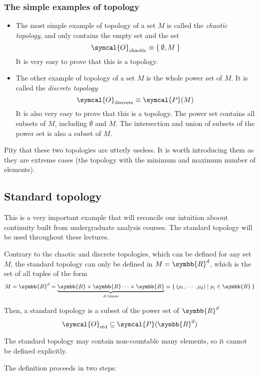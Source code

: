 \subsubsection{The simple examples of topology}
\begin{itemize}
\item The most simple example of topology of a set $M$ is called the
  \emph{chaotic topology}, and only contains the empty set and the set
  \[
    \symcal{O}_{\text{chaotic}} \equiv \Set{\emptyset, M}
  \]
  It is very easy to prove that this is a topology.
\item The other example of topology of a set $M$ is the whole power set of $M$. It is
  called the \emph{discrete topology}
  \[
    \symcal{O}_{\text{discrete}} \equiv \symcal{P}(M)
  \]
  It is also very easy to prove that this is a topology. The power set contains all
  subsets of $M$, including $\emptyset$ and $M$. The intersection and union of subsets
  of the power set is also a subset of $M$.
\end{itemize}
Pity that these two topologies are utterly useless. It is worth introducing them as they
are extreme cases (the topology with the minimum and maximum number of elements).

\subsection{Standard topology}
This is a very important example that will reconcile our intuition aboout continuity
built from undergraduate analysis courses. The standard topology will be used throughout
these lectures.

Contrary to the chaotic and discrete topologies, which can be defined for any set $M$,
the standard topology can only be defined in $M = \symbb{R}^d$, which is the set of all
tuples of the form
\[
  M = \symbb{R}^d
  = \underbrace{\symbb{R}\times\symbb{R}\cdots\times\symbb{R}}_{\text{d times}}
  \equiv \Set{(p_1, \cdots, p_d) | p_i\in\symbb{R}}
\]

Then, a standard topology is a subset of the power set of $\symbb{R}^d$
\[
  \symcal{O}_{\text{std}} \subseteq \symcal{P}(\symbb{R}^d)
\]

The standard topology may contain non-countable many elements, so it cannot be defined
explicitly.

The definition proceeds in two steps:

